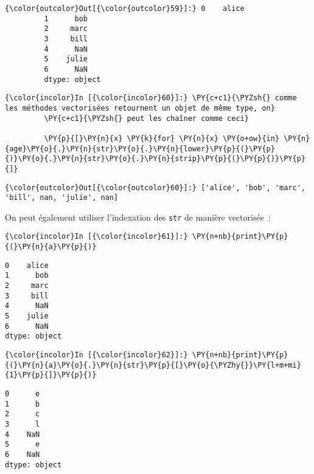 \begin{Verbatim}[commandchars=\\\{\}]
{\color{outcolor}Out[{\color{outcolor}59}]:} 0    alice
         1      bob
         2     marc
         3     bill
         4      NaN
         5    julie
         6      NaN
         dtype: object
\end{Verbatim}
            
    \begin{Verbatim}[commandchars=\\\{\}]
{\color{incolor}In [{\color{incolor}60}]:} \PY{c+c1}{\PYZsh{} comme les méthodes vectorisées retournent un objet de même type, on}
         \PY{c+c1}{\PYZsh{} peut les chaîner comme ceci}
         
         \PY{p}{[}\PY{n}{x} \PY{k}{for} \PY{n}{x} \PY{o+ow}{in} \PY{n}{age}\PY{o}{.}\PY{n}{str}\PY{o}{.}\PY{n}{lower}\PY{p}{(}\PY{p}{)}\PY{o}{.}\PY{n}{str}\PY{o}{.}\PY{n}{strip}\PY{p}{(}\PY{p}{)}\PY{p}{]}
\end{Verbatim}


\begin{Verbatim}[commandchars=\\\{\}]
{\color{outcolor}Out[{\color{outcolor}60}]:} ['alice', 'bob', 'marc', 'bill', nan, 'julie', nan]
\end{Verbatim}
            
    On peut également utiliser l'indexation des \texttt{str} de manière
vectorisée~:

    \begin{Verbatim}[commandchars=\\\{\}]
{\color{incolor}In [{\color{incolor}61}]:} \PY{n+nb}{print}\PY{p}{(}\PY{n}{a}\PY{p}{)}
\end{Verbatim}


    \begin{Verbatim}[commandchars=\\\{\}]
0    alice
1      bob
2     marc
3     bill
4      NaN
5    julie
6      NaN
dtype: object

    \end{Verbatim}

    \begin{Verbatim}[commandchars=\\\{\}]
{\color{incolor}In [{\color{incolor}62}]:} \PY{n+nb}{print}\PY{p}{(}\PY{n}{a}\PY{o}{.}\PY{n}{str}\PY{p}{[}\PY{o}{\PYZhy{}}\PY{l+m+mi}{1}\PY{p}{]}\PY{p}{)}
\end{Verbatim}


    \begin{Verbatim}[commandchars=\\\{\}]
0      e
1      b
2      c
3      l
4    NaN
5      e
6    NaN
dtype: object

    \end{Verbatim}

